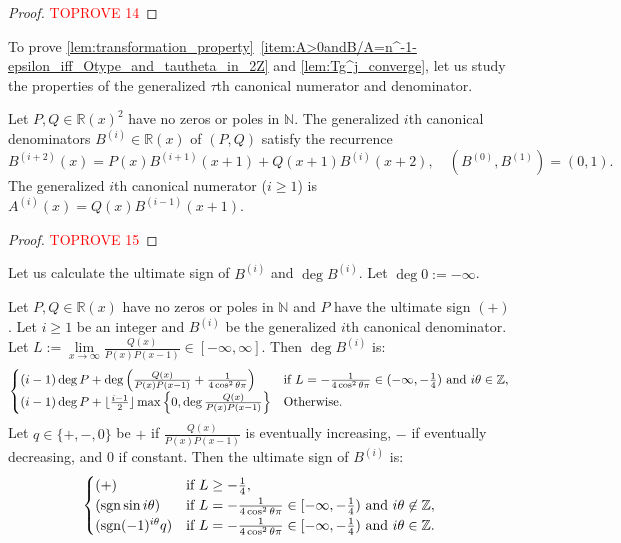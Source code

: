 \documentclass[a4paper,UKenglish,cleveref,autoref,thm-restate]{lipics-v2021}
\newcommand{\R}{\mathbb{R}}
\newcommand{\N}{\mathbb{N}}
\newcommand{\Z}{\mathbb{Z}}
\DeclareMathOperator{\sgn}{sgn}
\begin{document}
\begin{proof}\textcolor{red}{TOPROVE 14}\end{proof}

To prove \cref{lem:transformation_property}~\eqref{item:A>0andB/A=n^-1-epsilon_iff_Otype_and_tautheta_in_2Z} and \cref{lem:Tg^j_converge}, let us study the properties of the generalized $\tau$th canonical numerator and denominator. 

\begin{lemma} \label{lem:generalized_canonical_numerator/denominator}
Let $P, Q \in \R(x)^2$ have no zeros or poles in $\N$. The generalized $i$th canonical denominators $B^{(i)} \in \R(x)$ of $(P, Q)$ satisfy the recurrence
\begin{equation}\label{eq:B}
B^{(i+2)}(x) = P(x) B^{(i+1)}(x+1) + Q(x+1) B^{(i)}(x+2), \quad (B^{(0)}, B^{(1)}) = (0, 1). 
\end{equation}
The generalized $i$th canonical numerator ($i \geq 1$) is $A^{(i)}(x) = Q(x)B^{(i-1)}(x+1)$. 
\end{lemma}

\begin{proof}\textcolor{red}{TOPROVE 15}\end{proof}

Let us calculate the ultimate sign of $B^{(i)}$ and $\deg B^{(i)}$. Let $\deg 0 := - \infty$. 

\begin{lemma} \label{lem:B^i}
Let $P, Q \in \R(x)$ have no zeros or poles in $\N$ and $P$ have the ultimate sign $(+)$. Let $i \geq 1$ be an integer and $B^{(i)}$ be the generalized $i$th canonical denominator. Let $L := \lim\limits_{x \to \infty} \frac{Q(x)}{P(x)P(x-1)} \in [-\infty, \infty]$. Then $\deg B^{(i)}$ is:
\[
\begin{cases}
    (i-1) \deg P + \deg \left( \frac{Q(x)}{P(x)P(x-1)} + \frac1{4\cos^2 \theta \pi} \right) & \text{if $L = -\frac1{4 \cos^2 \theta \pi} \in (-\infty, -\frac14)$ and $ i \theta \in \Z$},
    \\
    (i-1) \deg P + \lfloor \frac{i-1}2 \rfloor \max\left\{ 0, \deg \frac{Q(x)}{P(x)P(x-1)} \right\} &  \text{Otherwise}.
\end{cases}
\]
Let $q \in \{ +, -, 0 \}$ be $+$ if $\frac{Q(x)}{P(x)P(x-1)}$ is eventually increasing, $-$ if eventually decreasing, and $0$ if constant. Then the ultimate sign of $B^{(i)}$ is:
\[
\begin{cases}
    (+) &  \text{if $L \geq -\frac14$},
    \\
    (\sgn \sin i \theta) & \text{if $L = -\frac1{4 \cos^2 \theta \pi} \in [-\infty, -\frac14) $ and $ i \theta \not\in \Z$},
    \\
    (\sgn (-1)^{i \theta} q) & \text{if $L = -\frac1{4 \cos^2 \theta \pi} \in [-\infty, -\frac14)$ and $ i \theta \in \Z$}.
\end{cases}
\]
\end{lemma}
\end{document}
